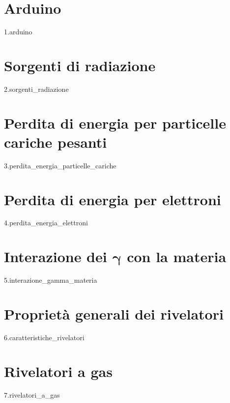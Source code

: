 \documentclass[12pt]{book}
\newcommand{\comment}[1]{}
\begin{document}
\newpage

\pagestyle{fancy}
\fancyhf{}
\fancyhead[LE]{\nouppercase{\textbf{\thepage}\hfill\leftmark}}
\fancyhead[RO]{\nouppercase{\rightmark\hfill\textbf{\thepage}}}


\chapter{Arduino}
{1.arduino}

\chapter{Sorgenti di radiazione}
{2.sorgenti_radiazione}

\chapter{Perdita di energia per particelle cariche pesanti}
{3.perdita_energia_particelle_cariche}

\chapter{Perdita di energia per elettroni}
{4.perdita_energia_elettroni}

\chapter[Interazione dei \texorpdfstring{$\gamma$}{\textgamma} con la materia]
{Interazione dei $\boldsymbol{\gamma}$ con la materia}
{5.interazione_gamma_materia}

\chapter{Proprietà generali dei rivelatori}\label{chap:caratteristiche_rivelatori}
{6.caratteristiche_rivelatori}

\chapter{Rivelatori a gas}
{7.rivelatori_a_gas}
\end{document}
